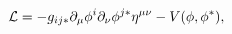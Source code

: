 \begin{equation}
{\cal L}=-g_{ij*}\partial_\mu \phi^i \partial_\nu \phi^{j*} \eta^{\mu\nu}
-V(\phi, \phi^*) ,
\end{equation}

